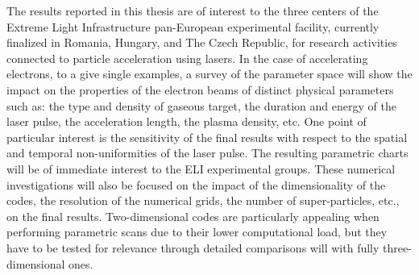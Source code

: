 \documentclass[12pt, class=report, crop=false]{standalone}
\begin{document}
The results reported in this thesis are of interest to the three centers of
the Extreme Light Infrastructure pan-European experimental facility,
currently finalized in Romania, Hungary, and The Czech Republic,
for research activities connected to particle acceleration using lasers.
In the case of accelerating electrons, to a give single examples, a survey of the parameter space will  show the impact on the properties of the electron beams of distinct physical parameters such as: the type and density of gaseous target, the duration and energy of the laser pulse, the acceleration length, the plasma density, etc.
One point of particular interest is the sensitivity of the final results with respect to the spatial and temporal non-uniformities of the laser pulse. The resulting parametric charts will be of immediate interest to the ELI experimental groups.
These numerical investigations will also be focused on the impact of the dimensionality of the codes, the resolution of the numerical grids, the number of super-particles, etc., on the final results.
Two-dimensional codes are particularly appealing when performing parametric scans due to their lower computational load, but they have to be tested for relevance through detailed comparisons will with fully three-dimensional ones.
\end{document}
